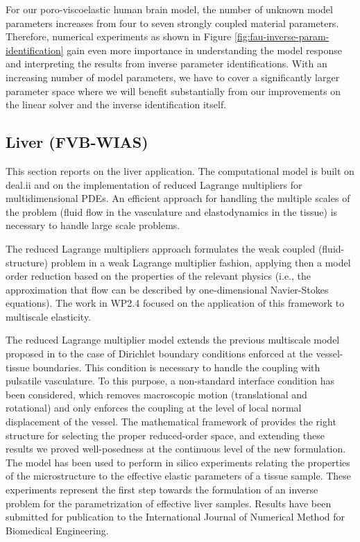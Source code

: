 \documentclass[a4paper,12pt]{article}
\begin{document}
For our poro-viscoelastic human brain model, the number of unknown model parameters increases from four to seven strongly coupled material parameters. Therefore, numerical experiments as shown in Figure \ref{fig:fau-inverse-param-identification} gain even more importance in understanding the model response and interpreting the results from inverse parameter identifications. With an increasing number of model parameters, we have to cover a significantly larger parameter space where we will benefit substantially from our improvements on the linear solver and the inverse identification itself.

\subsection{Liver (FVB-WIAS)}

This section reports on the liver application. The computational model is built on deal.ii and on the implementation of reduced Lagrange multipliers for multidimensional PDEs. An efficient approach for handling the multiple scales of the problem (fluid flow in the vasculature and elastodynamics in the tissue) is necessary to handle large scale problems.

The reduced Lagrange multipliers approach \citep{heltai2023reduced} formulates the weak coupled (fluid-structure) problem in a weak Lagrange multiplier fashion, applying then a model order reduction based on the properties of the relevant physics (i.e., the approximation that flow can be described by one-dimensional Navier-Stokes equations). The work in WP2.4 focused on the application of this framework to multiscale elasticity.

The reduced Lagrange multiplier  model extends the previous multiscale model proposed in \cite{heltai2019multiscale} to the case of Dirichlet boundary conditions enforced at the vessel-tissue boundaries. This condition is necessary to handle the coupling with pulsatile vasculature. To this purpose, a non-standard interface condition has been considered, which removes macroscopic motion (translational and rotational) and only enforces the coupling at the level of local normal displacement of the vessel. The mathematical framework of \cite{heltai2023reduced} provides the right structure for selecting the proper reduced-order space, and extending these results we proved well-posedness at the continuous level of the new formulation. The model has been used to perform in silico experiments relating the properties of the microstructure to the effective elastic parameters of a tissue sample. These experiments represent the first step towards the formulation of an inverse problem for the parametrization of effective liver samples. Results have been submitted for publication to the International Journal of Numerical Method for Biomedical Engineering.
\end{document}
